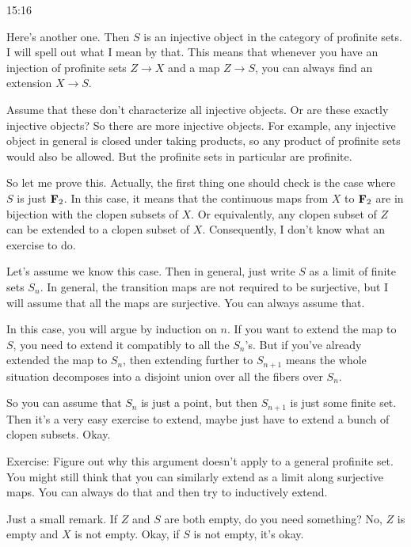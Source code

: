 \begin{unfinished}{15:16}
\begin{example}
\begin{remark}
Here's another one. Then $S$ is an injective object in the category of profinite sets. I will spell out what I mean by that. This means that whenever you have an injection of profinite sets $Z \to X$ and a map $Z \to S$, you can always find an extension $X \to S$.

Assume that these don't characterize all injective objects. Or are these exactly injective objects? So there are more injective objects. For example, any injective object in general is closed under taking products, so any product of profinite sets would also be allowed. But the profinite sets in particular are profinite.

So let me prove this. 
Actually, the first thing one should check is the case where $S$ is just $\mathbf F_2$. In this case, it means that the continuous maps from $X$ to $\mathbf F_2$ are in bijection with the clopen subsets of $X$. Or equivalently, any clopen subset of $Z$ can be extended to a clopen subset of $X$. Consequently, I don't know what an exercise to do.

Let's assume we know this case. Then in general, just write $S$ as a limit of finite sets $S_n$. In general, the transition maps are not required to be surjective, but I will assume that all the maps are surjective. You can always assume that.

In this case, you will argue by induction on $n$. If you want to extend the map to $S$, you need to extend it compatibly to all the $S_n$'s. But if you've already extended the map to $S_n$, then extending further to $S_{n+1}$ means the whole situation decomposes into a disjoint union over all the fibers over $S_n$.

So you can assume that $S_n$ is just a point, but then $S_{n+1}$ is just some finite set. Then it's a very easy exercise to extend, maybe just have to extend a bunch of clopen subsets. Okay.

Exercise: Figure out why this argument doesn't apply to a general profinite set. You might still think that you can similarly extend as a limit along surjective maps. You can always do that and then try to inductively extend.

\begin{remark}

Just a small remark. If $Z$ and $S$ are both empty, do you need something? No, $Z$ is empty and $X$ is not empty. Okay, if $S$ is not empty, it's okay.

\end{remark}


\end{remark}
\end{example}
\end{unfinished}
